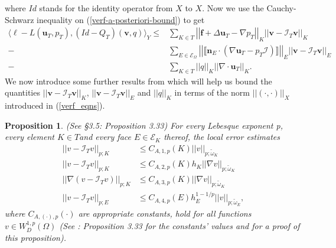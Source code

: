 \documentclass[12pt,a4paper]{article}
\newtheorem{proposition}[theorem]{Proposition}
\theoremstyle{definition}
\begin{document}
where $Id$ stands for the identity operator from $X$ to $X$.  Now we use the Cauchy-Schwarz inequality on (\ref{verf-a-posteriori-bound}) to get
\begin{equation}\label{verf-a-posteriori-bound-cs}
\begin{aligned}
\langle \ell -L\left(\textbf{u}_T,p_T\right),\left(Id-Q_T\right)\left(\textbf{v},q\right) \rangle_Y\leq
&\sum_{K\in T}\left|\left|\textbf{f}+\Delta \textbf{u}_T-\nabla p_T \right|\right|_K \left|\left|\textbf{v}-\mathcal{I}_T\textbf{v}\right|\right|_K\\
-&\sum_{E\in \mathcal{E}_{\Omega}}\left|\left|\llbracket\textbf{n}_E\cdot\left(\nabla \textbf{u}_T-p_T\mathcal{I}\right)\rrbracket \right|\right|_E \left|\left|\textbf{v}-\mathcal{I}_T\textbf{v}\right|\right|_E\\
-&\sum_{K\in T}\left|\left|q\right|\right|_K\left|\left|\nabla \cdot \textbf{u}_T\right|\right|_K.
\end{aligned}
\end{equation}
We now introduce some further results from \cite{verfurth2013posteriori} which will help us bound the quantities $\left|\left|\textbf{v}-\mathcal{I}_T\textbf{v}\right|\right|_K$, $\left|\left|\textbf{v}-\mathcal{I}_T\textbf{v}\right|\right|_E$ and $\left|\left|q\right|\right|_K$ in terms of the norm $\left|\left|\left(\cdot,\cdot\right)\right|\right|_X$ introduced in (\ref{verf_eqns}).
\begin{proposition}{(See \cite{verfurth2013posteriori} \S3.5: Proposition 3.33)} \label{verf_prop_bounds} For every Lebesque exponent p, every element $K\in T$and every face $E\in\mathcal{E}_K$ thereof, the local error estimates
\begin{equation}
\begin{aligned}
\left|\left|v-\mathcal{I}_Tv\right|\right|_{p;K}&\leq C_{A,1,p}\left(K\right)\left|\left|v\right|\right|_{p;\widetilde{\omega}_K}\\
\left|\left|v-\mathcal{I}_Tv\right|\right|_{p;K}&\leq C_{A,2,p}\left(K\right)h_K\left|\left|\nabla v\right|\right|_{p;\widetilde{\omega}_K}\\
\left|\left|\nabla\left(v-\mathcal{I}_Tv\right)\right|\right|_{p;K}&\leq C_{A,3,p}\left(K\right)\left|\left|\nabla v\right|\right|_{p;\widetilde{\omega}_K}\\
\left|\left|v-\mathcal{I}_Tv\right|\right|_{p;E}&\leq C_{A,4,p}\left(E\right)h_E^{1-1/p}\left|\left|v\right|\right|_{p;\widetilde{\omega}_E},
\end{aligned}
\end{equation}
where $C_{A,\left(\cdot\right),p}\left(\cdot\right)$ are appropriate constants, hold for all functions $v\in W^{1,p}_D\left(\Omega\right)$ (See \cite{verfurth2013posteriori}: Proposition 3.33 for the constants' values and for a proof of this proposition).
\end{proposition}
\end{document}

